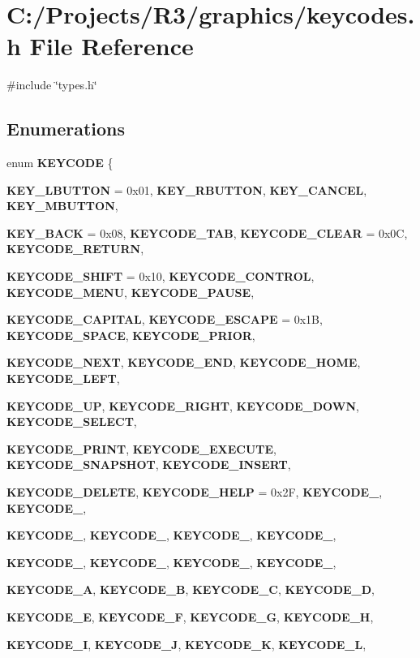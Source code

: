 \section{C:/Projects/R3/graphics/keycodes.h File Reference}
\label{keycodes_8h}
{\ttfamily \#include \char`\"{}types.h\char`\"{}}\par
\subsection*{Enumerations}
\begin{DoxyCompactItemize}
\item 
enum {\bf KEYCODE} \{ \par
{\bf KEY\_\-LBUTTON} =  0x01, 
{\bf KEY\_\-RBUTTON}, 
{\bf KEY\_\-CANCEL}, 
{\bf KEY\_\-MBUTTON}, 
\par
{\bf KEY\_\-BACK} =  0x08, 
{\bf KEYCODE\_\-TAB}, 
{\bf KEYCODE\_\-CLEAR} =  0x0C, 
{\bf KEYCODE\_\-RETURN}, 
\par
{\bf KEYCODE\_\-SHIFT} =  0x10, 
{\bf KEYCODE\_\-CONTROL}, 
{\bf KEYCODE\_\-MENU}, 
{\bf KEYCODE\_\-PAUSE}, 
\par
{\bf KEYCODE\_\-CAPITAL}, 
{\bf KEYCODE\_\-ESCAPE} =  0x1B, 
{\bf KEYCODE\_\-SPACE}, 
{\bf KEYCODE\_\-PRIOR}, 
\par
{\bf KEYCODE\_\-NEXT}, 
{\bf KEYCODE\_\-END}, 
{\bf KEYCODE\_\-HOME}, 
{\bf KEYCODE\_\-LEFT}, 
\par
{\bf KEYCODE\_\-UP}, 
{\bf KEYCODE\_\-RIGHT}, 
{\bf KEYCODE\_\-DOWN}, 
{\bf KEYCODE\_\-SELECT}, 
\par
{\bf KEYCODE\_\-PRINT}, 
{\bf KEYCODE\_\-EXECUTE}, 
{\bf KEYCODE\_\-SNAPSHOT}, 
{\bf KEYCODE\_\-INSERT}, 
\par
{\bf KEYCODE\_\-DELETE}, 
{\bf KEYCODE\_\-HELP} =  0x2F, 
{\bf KEYCODE\_}, 
{\bf KEYCODE\_}, 
\par
{\bf KEYCODE\_}, 
{\bf KEYCODE\_}, 
{\bf KEYCODE\_}, 
{\bf KEYCODE\_}, 
\par
{\bf KEYCODE\_}, 
{\bf KEYCODE\_}, 
{\bf KEYCODE\_}, 
{\bf KEYCODE\_}, 
\par
{\bf KEYCODE\_\-A}, 
{\bf KEYCODE\_\-B}, 
{\bf KEYCODE\_\-C}, 
{\bf KEYCODE\_\-D}, 
\par
{\bf KEYCODE\_\-E}, 
{\bf KEYCODE\_\-F}, 
{\bf KEYCODE\_\-G}, 
{\bf KEYCODE\_\-H}, 
\par
{\bf KEYCODE\_\-I}, 
{\bf KEYCODE\_\-J}, 
{\bf KEYCODE\_\-K}, 
{\bf KEYCODE\_\-L}, 
\par

\end{DoxyCompactItemize}
